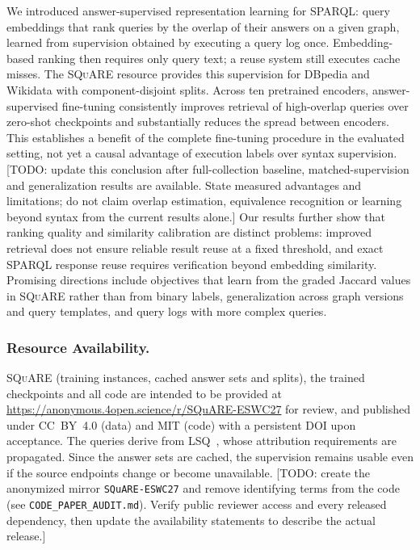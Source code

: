 \documentclass[runningheads]{llncs}
\newcommand{\squareds}{\textsc{SQuARE}}
\newcommand{\hp}[1]{{\color{red!75!black}#1}}
\begin{document}
We introduced answer-supervised representation learning for SPARQL: query
embeddings that rank queries by the overlap of their answers on a given graph,
learned
from supervision obtained by executing a query log once. Embedding-based
ranking then requires only query text; a reuse system still executes cache
misses. The \squareds{} resource provides this
supervision for DBpedia and Wikidata with component-disjoint splits. Across
ten pretrained encoders, answer-supervised fine-tuning consistently improves
retrieval of high-overlap queries over zero-shot checkpoints and
substantially reduces the spread between encoders. This establishes a
benefit of the complete fine-tuning procedure in the evaluated setting,
not yet a causal advantage of execution labels over syntax supervision.
\hp{[TODO: update this conclusion after full-collection baseline,
matched-supervision and generalization results are available. State measured
advantages and limitations; do not claim overlap estimation, equivalence
recognition or learning beyond syntax from the current results alone.]} Our results further show that ranking quality and
similarity calibration are distinct problems: improved retrieval does not
ensure reliable result reuse at a fixed threshold, and exact SPARQL response
reuse requires verification beyond embedding similarity.
Promising directions include objectives
that learn from the graded Jaccard
values in \squareds{} rather than from binary labels, generalization across
graph versions and query templates, and query logs with more complex queries.

\subsubsection*{Resource Availability.}
\label{sec:availability}
\squareds{} (training instances, cached answer sets and splits), the trained checkpoints
and all code are intended to be provided at
\url{https://anonymous.4open.science/r/SQuARE-ESWC27} for review, and
published under CC~BY~4.0 (data) and MIT (code) with a persistent DOI upon
acceptance. The queries derive from LSQ~\cite{saleem2015lsq}, whose
attribution requirements are propagated. Since the answer sets are cached,
the supervision remains usable even if the source endpoints change or become
unavailable.
\hp{[TODO: create the anonymized mirror \texttt{SQuARE-ESWC27} and remove
identifying terms from the code (see \texttt{CODE\_PAPER\_AUDIT.md}). Verify
public reviewer access and every released dependency, then update the
availability statements to describe the actual release.]}
\end{document}

